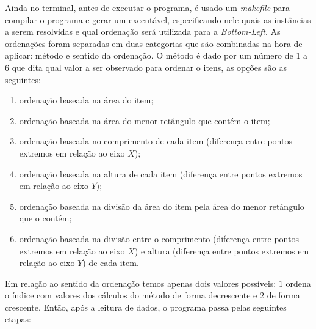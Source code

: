 Ainda no terminal, antes de executar o programa, é usado um \textit{makefile} para compilar o programa e gerar um executável, especificando nele quais as instâncias a serem resolvidas e qual ordenação será utilizada para a \textit{Bottom-Left}. 
As ordenações foram separadas em duas categorias que são combinadas na hora de aplicar: método e sentido da ordenação. 
O método é dado por um número de 1 a 6 que dita qual valor a ser observado para ordenar o itens, as opções são as seguintes:

\begin{enumerate}
    \item ordenação baseada na área do item;
    \item ordenação baseada na área do menor retângulo que contém o item;
    \item ordenação baseada no comprimento de cada item (diferença entre pontos extremos em relação ao eixo $X$);
    \item ordenação baseada na altura de cada item (diferença entre pontos extremos em relação ao eixo $Y$);
    \item ordenação baseada na divisão da área do item pela área do menor retângulo que o contém;
    \item ordenação baseada na divisão entre o comprimento (diferença entre pontos extremos em relação ao eixo $X$) e altura (diferença entre pontos extremos em relação ao eixo $Y$) de cada item.
\end{enumerate}

Em relação ao sentido da ordenação temos apenas dois valores possíveis: $1$ ordena o índice com valores dos cálculos do método de forma decrescente e $2$ de forma crescente. 
Então, após a leitura de dados, o programa passa pelas seguintes etapas:

